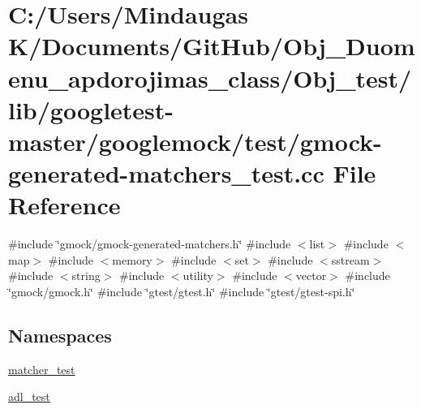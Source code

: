\hypertarget{_obj__test_2lib_2googletest-master_2googlemock_2test_2gmock-generated-matchers__test_8cc}{}\section{C\+:/\+Users/\+Mindaugas K/\+Documents/\+Git\+Hub/\+Obj\+\_\+\+Duomenu\+\_\+apdorojimas\+\_\+class/\+Obj\+\_\+test/lib/googletest-\/master/googlemock/test/gmock-\/generated-\/matchers\+\_\+test.cc File Reference}
\label{_obj__test_2lib_2googletest-master_2googlemock_2test_2gmock-generated-matchers__test_8cc}
{\ttfamily \#include \char`\"{}gmock/gmock-\/generated-\/matchers.\+h\char`\"{}}\newline
{\ttfamily \#include $<$list$>$}\newline
{\ttfamily \#include $<$map$>$}\newline
{\ttfamily \#include $<$memory$>$}\newline
{\ttfamily \#include $<$set$>$}\newline
{\ttfamily \#include $<$sstream$>$}\newline
{\ttfamily \#include $<$string$>$}\newline
{\ttfamily \#include $<$utility$>$}\newline
{\ttfamily \#include $<$vector$>$}\newline
{\ttfamily \#include \char`\"{}gmock/gmock.\+h\char`\"{}}\newline
{\ttfamily \#include \char`\"{}gtest/gtest.\+h\char`\"{}}\newline
{\ttfamily \#include \char`\"{}gtest/gtest-\/spi.\+h\char`\"{}}\newline
\subsection*{Namespaces}
\begin{DoxyCompactItemize}
\item 
 \mbox{\hyperlink{namespacematcher__test}{matcher\+\_\+test}}
\item 
 \mbox{\hyperlink{namespaceadl__test}{adl\+\_\+test}}
\end{DoxyCompactItemize}
